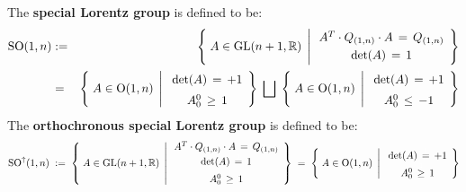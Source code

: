 \vskip 0.5cm
\begin{definition}
\mbox{}
\vskip 0.1cm
\noindent
The \textbf{special Lorentz group} is defined to be:
\begin{eqnarray*}
\SO(1,n)
& := &
	\left\{\;
		A \overset{{\color{white}.}}{\in} \GL(n+1,\Re)
		\;\left\vert\,
			\begin{array}{ccc}
			A^{T} \cdot Q_{(1,n)} \cdot A \,=\, Q_{(1,n)}
			\\
			\textnormal{det}(A) \,\overset{{\color{white}1}}{=}\, 1
			\end{array}
			\right.
		\!\right\}
\\
& = &
	\left\{\;
		A \overset{{\color{white}.}}{\in} \textnormal{O}(1,n)
		\;\left\vert\;
			\begin{array}{ccc}
			\textnormal{det}(A) \,\overset{{\color{white}1}}{=}\, +1
			\\
			A^{0}_{0} \,\overset{{\color{white}1}}{\geq}\, 1
			\end{array}
			\right.
		\!\right\}
	\;\bigsqcup\;
	\left\{\;
		A \overset{{\color{white}.}}{\in} \textnormal{O}(1,n)
		\;\left\vert\;
			\begin{array}{ccc}
			\textnormal{det}(A) \,\overset{{\color{white}1}}{=}\, +1
			\\
			A^{0}_{0} \,\overset{{\color{white}1}}{\leq}\, -1
			\end{array}
			\right.
		\!\right\}
\end{eqnarray*}
The \textbf{orthochronous special Lorentz group} is defined to be:
\begin{equation*}
\SO^{\uparrow}(1,n)
\; := \;
	\left\{\;
		A \overset{{\color{white}.}}{\in} \GL(n+1,\Re)
		\;\left\vert\,
			\begin{array}{ccc}
			A^{T} \cdot Q_{(1,n)} \cdot A \,=\, Q_{(1,n)}
			\\
			\textnormal{det}(A) \,\overset{{\color{white}1}}{=}\, 1
			\\
			A^{0}_{0} \,\overset{{\color{white}1}}{\geq}\, 1
			\end{array}
			\right.
		\!\right\}
\; = \;
	\left\{\;
		A \overset{{\color{white}.}}{\in} \textnormal{O}(1,n)
		\;\left\vert\;
			\begin{array}{ccc}
			\textnormal{det}(A) \,\overset{{\color{white}1}}{=}\, +1
			\\
			A^{0}_{0} \,\overset{{\color{white}1}}{\geq}\, 1
			\end{array}
			\right.
		\!\right\}
\end{equation*}
\end{definition}

